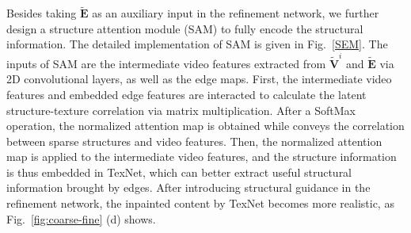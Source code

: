 Besides taking $\boldsymbol{\widetilde{E}}$ as an auxiliary input in the refinement network, we further design a structure attention module (SAM) to fully encode the structural information.
The detailed implementation of SAM is given in Fig.~\ref{SEM}.
The inputs of SAM are the intermediate video features extracted from $\boldsymbol{\widetilde{V}}^i$ and $\boldsymbol{\widetilde{E}}$ via 2D convolutional layers, as well as
the edge maps. %
First, the intermediate video features and embedded edge features are interacted to calculate the latent structure-texture correlation via matrix multiplication. 
After a SoftMax operation, the normalized attention map is obtained while conveys the correlation between sparse structures and video features.
%
Then, the normalized attention map is applied to the intermediate video features, and the structure information is thus embedded in TexNet, which can better extract useful structural information brought by edges.
After introducing structural guidance in the refinement network, the inpainted content by TexNet becomes more realistic, as Fig.~\ref{fig:coarse-fine} (d) shows.



